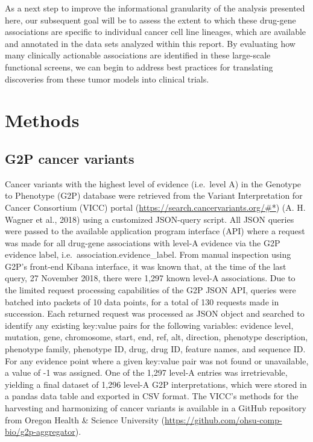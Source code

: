 \documentclass[man,floatsintext]{apa6}
\begin{document}
As a next step to improve the informational granularity of the analysis
presented here, our subsequent goal will be to assess the extent to
which these drug-gene associations are specific to individual cancer
cell line lineages, which are available and annotated in the data sets
analyzed within this report. By evaluating how many clinically
actionable associations are identified in these large-scale functional
screens, we can begin to address best practices for translating
discoveries from these tumor models into clinical trials.

\newpage

\section{Methods}\label{methods}

\subsection{G2P cancer variants}\label{g2p-cancer-variants}

Cancer variants with the highest level of evidence (i.e.~level A) in the
Genotype to Phenotype (G2P) database were retrieved from the Variant
Interpretation for Cancer Consortium (VICC) portal
(\url{https://search.cancervariants.org/\#*}) (A. H. Wagner et al.,
2018) using a customized JSON-query script. All JSON queries were passed
to the available application program interface (API) where a request was
made for all drug-gene associations with level-A evidence via the G2P
evidence label, i.e.~association.evidence\_label. From manual inspection
using G2P's front-end Kibana interface, it was known that, at the time
of the last query, 27 November 2018, there were 1,297 known level-A
associations. Due to the limited request processing capabilities of the
G2P JSON API, queries were batched into packets of 10 data points, for a
total of 130 requests made in succession. Each returned request was
processed as JSON object and searched to identify any existing key:value
pairs for the following variables: evidence level, mutation, gene,
chromosome, start, end, ref, alt, direction, phenotype description,
phenotype family, phenotype ID, drug, drug ID, feature names, and
sequence ID. For any evidence point where a given key:value pair was not
found or unavailable, a value of -1 was assigned. One of the 1,297
level-A entries was irretrievable, yielding a final dataset of 1,296
level-A G2P interpretations, which were stored in a pandas data table
and exported in CSV format. The VICC's methods for the harvesting and
harmonizing of cancer variants is available in a GitHub repository from
Oregon Health \& Science University
(\url{https://github.com/ohsu-comp-bio/g2p-aggregator}).
\end{document}
